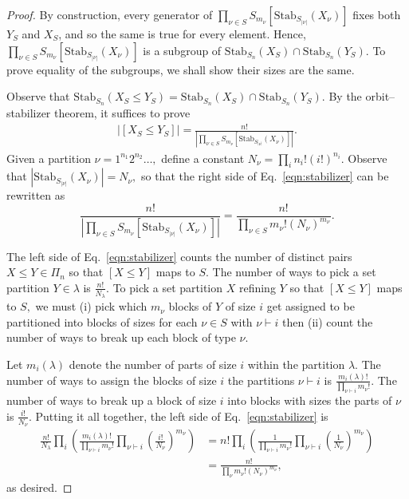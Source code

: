\documentclass[ALCO, Unicode]{cedram}
\def\stab{\mathrm{Stab}}
\begin{document}
\begin{proof}
By construction, every generator of $\prod_{\nu \in S} S_{m_\nu}\left[\stab_{S_{|\nu|}}\left(X_\nu\right)\right]$ fixes both $Y_S$ and $X_S$, and so the same is true for every element. Hence, $\prod_{\nu \in S} S_{m_\nu} \left[\stab_{S_{|\nu|}}\left(X_\nu\right)\right]$ is a subgroup of $\stab_{S_n}(X_S) \cap \stab_{S_n}(Y_S).$  To prove equality of the subgroups, we shall show their sizes are the same. 

Observe that $\stab_{S_n}\left(X_S \leq Y_S\right) = \stab_{S_n}(X_S) \cap \stab_{S_n}\left(Y_S\right).$ By the orbit--stabilizer theorem, it suffices to prove
\begin{align}\label{eqn:stabilizer}
    \left \lvert [X_S \leq Y_S]\right  \rvert = \frac{n!}{\left \lvert \prod_{\nu \in S}S_{m_\nu}\left[\stab_{S_{|\nu|}}\left(X_\nu\right)\right]\right \rvert}.
\end{align}
Given a partition $\nu = 1^{n_1} 2^{n_2} \ldots, $ define a constant $N_\nu = \prod_{i}n_i! (i!)^{n_i}.$
Observe that $\left \lvert \stab_{S_{|\nu|}}\left(X_\nu\right)\right \rvert = N_\nu,$ so that the right side of Eq.~\eqref{eqn:stabilizer} can be rewritten as
\[\frac{n!}{\left \lvert \prod_{\nu \in S}S_{m_\nu}\left[\stab_{S_{|\nu|}}\left(X_\nu\right)\right]\right \rvert} = \frac{n!}{\prod_{\nu \in S}m_\nu! \left(N_\nu\right)^{m_\nu}}.\]

The left side of Eq.~\eqref{eqn:stabilizer} counts the number of distinct pairs $X \leq Y \in \Pi_n$ so that $[X \leq Y]$ maps to $S.$ The number of ways to pick a set partition $Y \in \lambda$ is $\frac{n!}{N_\lambda}.$ To pick a set partition $X$ refining $Y$ so that $[X \leq Y]$ maps to $S,$ we must (i) pick which $m_\nu$ blocks of $Y$ of size $i$ get assigned to be partitioned into blocks of sizes for each $\nu \in S$ with $\nu \vdash i$ then (ii) count the number of ways to break up each block of type $\nu$. 

Let $m_i(\lambda)$ denote the number of parts of size $i$ within the partition $\lambda.$ The number of ways to assign the blocks of size $i$ the partitions $\nu \vdash i$ is $\frac{m_i(\lambda)!}{\prod_{\nu \vdash i}m_\nu!}.$ The number of ways to break up a block of size $i$ into blocks with sizes the parts of $\nu$ is $\frac{i!}{N_\nu}.$ Putting it all together, the left side of Eq.~\eqref{eqn:stabilizer} is
\begin{align*}
\frac{n!}{N_\lambda} \prod_{i} \left(\frac{m_i(\lambda)!}{\prod_{\nu \vdash i} m_\nu!} \prod_{\nu \vdash i}\left(\frac{i!}{N_\nu}\right)^{m_\nu}\right) &=n! \prod_{i} \left(\frac{1}{\prod_{\nu \vdash i} m_\nu!} \prod_{\nu \vdash i}\left(\frac{1}{N_\nu}\right)^{m_\nu}\right)\\
&= \frac{n!}{\prod_\nu m_\nu! \left (N_\nu\right)^{m_\nu}},
\end{align*}
as desired.
\end{proof}
\end{document}
